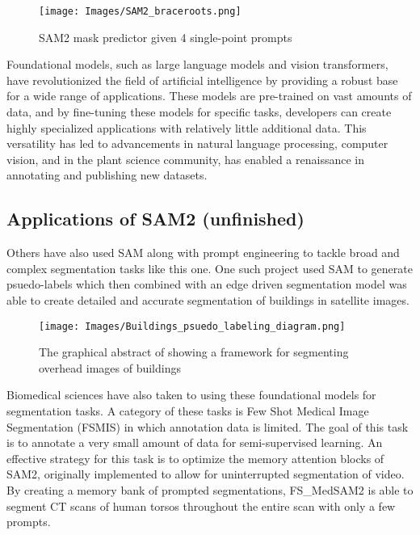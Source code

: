 \begin{figure}
    \centering
    \texttt{[image: Images/SAM2\_braceroots.png]}
    \caption{SAM2 mask predictor given 4 single-point prompts}
    \label{fig:SAM2_BR}
\end{figure}

Foundational models, such as large language models and vision transformers, have revolutionized the field of artificial intelligence by providing a robust base for a wide range of applications. These models are pre-trained on vast amounts of data, and by fine-tuning these models for specific tasks, developers can create highly specialized applications with relatively little additional data.  This versatility has led to advancements in natural language processing, computer vision, and in the plant science community, has enabled a renaissance in annotating and publishing new datasets.\cite{plantScienceAnnRev24}

\subsection{Applications of SAM2 (unfinished)}
Others have also used SAM along with prompt engineering to tackle broad and complex segmentation tasks like this one. One such project used SAM to generate psuedo-labels which then combined with an edge driven segmentation model was able to create detailed and accurate segmentation of buildings in satellite images.\cite{rs16030526}
\begin{figure}[H]
    \centering
    \texttt{[image: Images/Buildings\_psuedo\_labeling\_diagram.png]}
    \caption{The graphical abstract of \cite{rs16030526} showing a framework for segmenting overhead images of buildings}
    \label{fig:Buildings}
\end{figure}

Biomedical sciences have also taken to using these foundational models for segmentation tasks. A category of these tasks is Few Shot Medical Image Segmentation (FSMIS) in which annotation data is limited. The goal of this task is to annotate a very small amount of data for semi-supervised learning. \cite{bai2024fsmedsam2exploringpotentialsam2} An effective strategy for this task is to optimize the memory attention blocks of SAM2, originally implemented to allow for uninterrupted segmentation of video. By creating a memory bank of prompted segmentations, FS\_MedSAM2 is able to segment CT scans of human torsos throughout the entire scan with only a few prompts. \cite{bai2024fsmedsam2exploringpotentialsam2}

